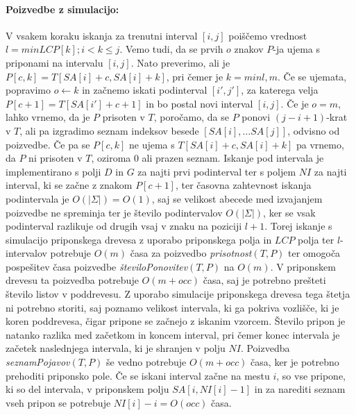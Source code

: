 \paragraph{Poizvedbe z simulacijo:}
V vsakem koraku iskanja za trenutni interval $[i,j]$ poiščemo vrednost $l=min{LCP[k];i<k\le j}$. Vemo tudi, da se prvih $o$ znakov $P$-ja ujema s priponami na intervalu $[i,j]$. Nato preverimo, ali je $P[c,k]=T[SA[i]+c,SA[i]+k]$, pri čemer je $k=min{l,m}$. Če se ujemata, popravimo $o\leftarrow k$ in začnemo iskati podinterval $[i',j']$, za katerega velja $P[c+1]=T[SA[i']+c+1]$ in bo postal novi interval $[i,j]$. Če je $o=m$, lahko vrnemo, da je $P$ prisoten v $T$, poročamo, da se $P$ ponovi $(j-i+1)$-krat v $T$, ali pa izgradimo seznam indeksov besede $[SA[i],\dots SA[j]]$, odvisno od poizvedbe. Če pa se $P[c,k]$ ne ujema s $T[SA[i]+c,SA[i]+k]$ pa vrnemo, da $P$ ni prisoten v $T$, oziroma 0 ali prazen seznam. Iskanje pod intervala je implementirano s polji $D$ in $G$ za najti prvi podinterval ter s poljem $NI$ za najti interval, ki se začne z znakom $P[c+1]$, ter časovna zahtevnost iskanja podintervala je $O(|\Sigma|)=O(1)$, saj se velikost abecede med izvajanjem poizvedbe ne spreminja ter je število podintervalov $O(|\Sigma|)$, ker se vsak podinterval razlikuje od drugih vsaj v znaku na poziciji $l+1$. Torej iskanje s simulacijo priponskega drevesa z uporabo priponskega polja in $LCP$ polja ter $l$-intervalov potrebuje $O(m)$ časa za poizvedbo \textit{prisotnost}$(T,P)$ ter omogoča pospešitev časa poizvedbe \textit{številoPonovitev}$(T,P)$ na $O(m)$. V priponskem drevesu ta poizvedba potrebuje $O(m+occ)$ časa, saj je potrebno prešteti število listov v poddrevesu. Z uporabo simulacije priponskega drevesa tega štetja ni potrebno storiti, saj poznamo velikost intervala, ki ga pokriva vozlišče, ki je koren poddrevesa, čigar pripone se začnejo z iskanim vzorcem. Število pripon je natanko razlika med začetkom in koncem interval, pri čemer konec intervala je začetek naslednjega intervala, ki je shranjen v polju $NI$. Poizvedba \textit{seznamPojavov}$(T,P)$ še vedno potrebuje $O(m+occ)$ časa, ker je potrebno prehoditi priponsko pole. Če se iskani interval začne na mestu $i$, so vse pripone, ki so del intervala, v priponskem polju $SA[i, NI[i]-1]$ in za narediti seznam vseh pripon se potrebuje $NI[i]-i=O(occ)$ časa. 
